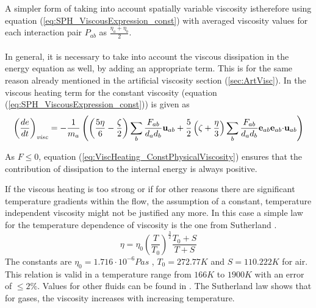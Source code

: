 \documentclass[11pt,a4paper,twoside]{report}
\begin{document}
A simpler form of taking into account spatially variable viscosity istherefore  using equation (\ref{eq:SPH_ViscousExpression_const}) with averaged viscosity values for each interaction pair $P_{ab}$ as $\frac{\eta_a+\eta_b}{2}$.\\
\\
\indent
In general, it is necessary to take into account the viscous dissipation in the energy equation as well, by adding an appropriate term. This is for the same reason already mentioned in the artificial viscosity section (\ref{sec:ArtVisc}). In \cite{Espanol2003} the viscous heating term for the constant viscosity (equation (\ref{eq:SPH_ViscousExpression_const})) is given as 
\begin{equation}
\label{eq:ViscHeating_ConstPhysicalViscosity}
 \left(\frac{de}{dt}\right)_{\mathit{visc}}=-\frac{1}{m_a}\left(\left(\frac{5\eta}{6}-\frac{\zeta}{2}\right)\sum_b\frac{F_{ab}}{d_a d_b}{\bf u}_{ab}+\frac{5}{2} \left(\zeta+\frac{\eta}{3}\right) \sum_b\frac{F_{ab}}{d_a d_b}{\bf e}_{ab} {\bf e}_{ab}{\bf \cdot u}_{ab}\right)
\end{equation}

As $ F\leq 0$, equation (\ref{eq:ViscHeating_ConstPhysicalViscosity}) ensures that the contribution of dissipation to the internal energy is always positive.

If the viscous heating is too strong or if for other reasons 
there are significant temperature gradients within the flow, the assumption of a constant, temperature independent viscosity might not be justified any more. In this case a simple law for the temperature dependence of viscosity is the one from Sutherland \cite{White1974}.
\begin{equation}
\label{eq:Sutherland_visc}
\eta=\eta_0 \left(\frac{T}{T_0}\right)^{\frac{3}{2}}\frac{T_0+S}{T+S}
\end{equation}
The constants are $\eta_0=1.716\cdot10^{-6}Pa s$
, $T_0=272.77K$ and $S=110.222K$ for air. This relation is valid in a temperature range from $166K$ to $1900K$ with an error of $\leq2\%$.
Values for other fluids can be found in \cite{White1974}. The Sutherland law shows that for gases, the viscosity increases with increasing temperature. %
\end{document}
